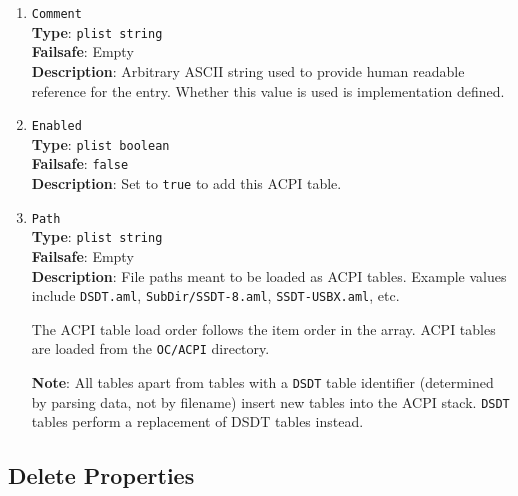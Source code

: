 \documentclass[]{article}
\begin{document}
\begin{enumerate}
\item
  \texttt{Comment}\\
  \textbf{Type}: \texttt{plist\ string}\\
  \textbf{Failsafe}: Empty\\
  \textbf{Description}: Arbitrary ASCII string used to provide human readable
  reference for the entry. Whether this value is used is implementation defined.

\item
  \texttt{Enabled}\\
  \textbf{Type}: \texttt{plist\ boolean}\\
  \textbf{Failsafe}: \texttt{false}\\
  \textbf{Description}: Set to \texttt{true} to add this ACPI table.

\item
  \texttt{Path}\\
  \textbf{Type}: \texttt{plist\ string}\\
  \textbf{Failsafe}: Empty\\
  \textbf{Description}: File paths meant to be loaded as ACPI tables.
  Example values include \texttt{DSDT.aml}, \texttt{SubDir/SSDT-8.aml},
  \texttt{SSDT-USBX.aml}, etc.

  The ACPI table load order follows the item order in the array. ACPI tables
  are loaded from the \texttt{OC/ACPI} directory.

  \textbf{Note}: All tables apart from tables with a \texttt{DSDT} table identifier
  (determined by parsing data, not by filename) insert new tables into the ACPI stack.
  \texttt{DSDT} tables perform a replacement of DSDT tables instead.

\end{enumerate}

\subsection{Delete Properties}\label{acpipropsdelete}
\end{document}
